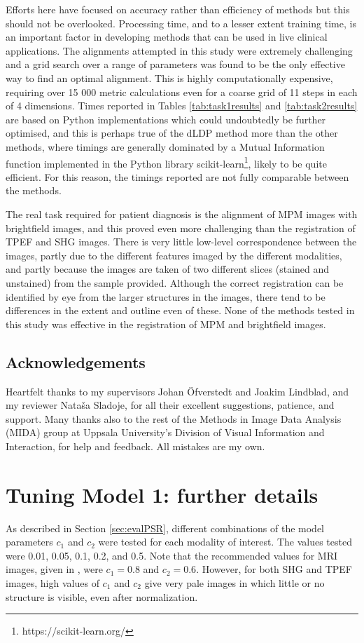 \documentclass{report}
\begin{document}
Efforts here have focused on accuracy rather than efficiency of methods but this should not be overlooked. Processing time, and to a lesser extent training time, is an important factor in developing methods that can be used in live clinical applications. The alignments attempted in this study were extremely challenging and a grid search over a range of parameters was found to be the only effective way to find an optimal alignment. This is highly computationally expensive, requiring over 15 000 metric calculations even for a coarse grid of 11 steps in each of 4 dimensions. Times reported in Tables \ref{tab:task1results} and \ref{tab:task2results} are based on Python implementations which could undoubtedly be further optimised, and this is perhaps true of the dLDP method more than the other methods, where timings are generally dominated by a Mutual Information function implemented in the Python library scikit-learn\footnote{https://scikit-learn.org/}, likely to be quite efficient. For this reason, the timings reported are not fully comparable between the methods.

The real task required for patient diagnosis is the alignment of MPM images with brightfield images, and this proved even more challenging than the registration of TPEF and SHG images. There is very little low-level correspondence between the images, partly due to the different features imaged by the different modalities, and partly because the images are taken of two different slices (stained and unstained) from the sample provided. Although the correct registration can be identified by eye from the larger structures in the images, there tend to be differences in the extent and outline even of these. None of the methods tested in this study was effective in the registration of MPM and brightfield images.

\section{Acknowledgements}
Heartfelt thanks to my supervisors Johan Öfverstedt and Joakim Lindblad, and my reviewer Nata\v sa Sladoje, for all their excellent suggestions, patience, and support. Many thanks also to the rest of the Methods in Image Data Analysis (MIDA) group at Uppsala University's Division of Visual Information and Interaction, for help and feedback. All mistakes are my own.

{}

\appendix
\chapter{Tuning Model 1: further details}
\label{appendix:tuning}
As described in Section \ref{sec:evalPSR}, different combinations of the model parameters $c_1$ and $c_2$ were tested for each modality of interest. The values tested were 0.01, 0.05, 0.1, 0.2, and 0.5. Note that the recommended values for MRI images, given in \cite{zhu2018pcanet}, were $c_1=0.8$ and $c_2=0.6$. However, for both SHG and TPEF images, high values of $c_1$ and $c_2$ give very pale images in which little or no structure is visible, even after normalization.
\end{document}
